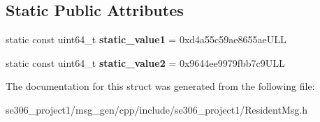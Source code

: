 \subsection*{Static Public Attributes}
\begin{DoxyCompactItemize}
\item 
\hypertarget{structros_1_1message__traits_1_1MD5Sum_3_01_1_1se306__project1_1_1ResidentMsg___3_01ContainerAllocator_01_4_01_4_a37972fc33e3a5f7f44d6e783d452d689}{static const uint64\-\_\-t {\bfseries static\-\_\-value1} = 0xd4a55c59ae8655ae\-U\-L\-L}\label{structros_1_1message__traits_1_1MD5Sum_3_01_1_1se306__project1_1_1ResidentMsg___3_01ContainerAllocator_01_4_01_4_a37972fc33e3a5f7f44d6e783d452d689}

\item 
\hypertarget{structros_1_1message__traits_1_1MD5Sum_3_01_1_1se306__project1_1_1ResidentMsg___3_01ContainerAllocator_01_4_01_4_a83dba0321612123fae5b2a20ccaa2aee}{static const uint64\-\_\-t {\bfseries static\-\_\-value2} = 0x9644ee9979fbb7c9\-U\-L\-L}\label{structros_1_1message__traits_1_1MD5Sum_3_01_1_1se306__project1_1_1ResidentMsg___3_01ContainerAllocator_01_4_01_4_a83dba0321612123fae5b2a20ccaa2aee}

\end{DoxyCompactItemize}


The documentation for this struct was generated from the following file\-:\begin{DoxyCompactItemize}
\item 
se306\-\_\-project1/msg\-\_\-gen/cpp/include/se306\-\_\-project1/Resident\-Msg.\-h\end{DoxyCompactItemize}
